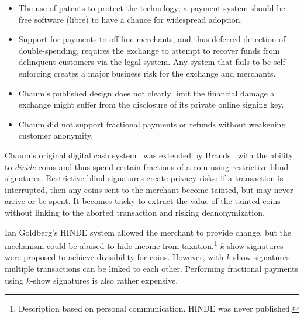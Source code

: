 \documentclass{llncs}
\begin{document}
\begin{itemize}
 \item The use of patents to protect the technology; a payment system
   should be free software (libre) to have a chance for widespread adoption.
 \item Support for payments to off-line merchants, and thus deferred
   detection of double-spending, requires the exchange to attempt to
   recover funds from delinquent customers via the legal system.
   Any system that fails to be self-enforcing creates a major
   business risk for the exchange and merchants.
 \item %
   Chaum's published design does not clearly
   limit the financial damage a exchange might suffer from the
   disclosure of its private online signing key.
 \item Chaum did not support fractional payments or refunds without
   weakening customer anonymity.
\end{itemize}

Chaum's original digital cash system~\cite{chaum1983blind} was
extended by Brands~\cite{brands1993efficient} with the ability to {\em
  divide} coins and thus spend certain fractions of a coin using
restrictive blind signatures.  Restrictive blind signatures create
privacy risks: if a transaction is interrupted, then any coins sent to
the merchant become tainted, but may never arrive or be spent.  It
becomes tricky to extract the value of the tainted coins without
linking to the aborted transaction and risking deanonymization.

Ian Goldberg's HINDE system allowed the merchant to provide change,
but the mechanism could be abused to hide income from
taxation.\footnote{Description based on personal communication. HINDE
  was never published.}  $k$-show
signatures~\cite{brands1993efficient} were proposed to achieve
divisibility for coins.  However, with $k$-show signatures multiple
transactions can be linked to each other.  Performing fractional
payments using $k$-show signatures is also rather expensive.
\end{document}
